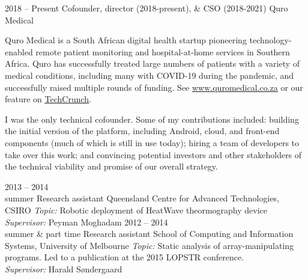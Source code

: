\documentclass[9pt]{developercv} %
\begin{document}
\vspace{1em}


\begin{entrylist}
    \entry
        {2018 -- Present}%
        {Cofounder, director (2018-present), \& CSO (2018-2021)}
        {Quro Medical}
        {Quro Medical is a South African digital health startup pioneering technology-enabled remote patient monitoring and hospital-at-home services in Southern Africa.
        Quro has successfully treated large numbers of patients with a variety of medical conditions, including many with COVID-19 during the pandemic, and successfully raised multiple rounds of funding. See \underline{\href{https://www.quromedical.co.za}{www.quromedical.co.za}} or our feature on \underline{\href{https://techcrunch.com/2021/04/14/south-africas-quro-medical-comes-out-of-stealth-with-1-1m-to-expand-its-hospital-at-home-service/}{TechCrunch}}.

        I was the only technical cofounder.
        Some of my contributions included: building the initial version of the platform, including Android, cloud, and front-end components (much of which is still in use today); hiring a team of developers to take over this work; and convincing potential investors and other stakeholders of the technical viability and promise of our overall strategy.}
    \entry
        {2013 -- 2014\\\footnotesize{summer}}
        {Research assistant}
        {Queensland Centre for Advanced Technologies, CSIRO}
        {\textit{Topic:} Robotic deployment of HeatWave theormography device\\
        \textit{Supervisor:} Peyman Moghadam}
    \entry
        {2012 -- 2014\\\footnotesize{summer \& part time}}
        {Research assistant}
        {School of Computing and Information Systems, University of Melbourne}
        {\textit{Topic:} Static analysis of array-manipulating programs. Led to a publication at the 2015 LOPSTR conference. \\
        \textit{Supervisor:} Harald S\o ndergaard}
\end{entrylist}
\end{document}
